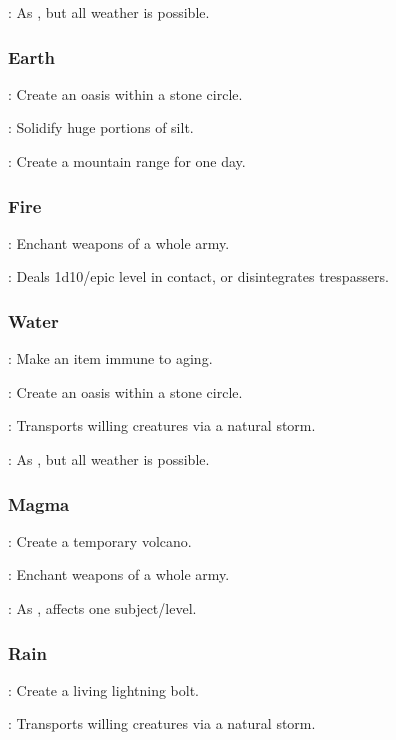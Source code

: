 : As , but all weather is possible.


\subsubsection{Earth}
: Create an oasis within a stone circle.



: Solidify huge portions of silt.

: Create a mountain range for one day.


\subsubsection{Fire}
: Enchant weapons of a whole army. %

: Deals 1d10/epic level in contact, or disintegrates trespassers.


\subsubsection{Water}
: Make an item immune to aging.

: Create an oasis within a stone circle.

: Transports willing creatures via a natural storm.

: As , but all weather is possible.


\subsubsection{Magma}
: Create a temporary volcano. %

: Enchant weapons of a whole army. %

: As , affects one subject/level. %


\subsubsection{Rain}
: Create a living lightning bolt. %

: Transports willing creatures via a natural storm.

